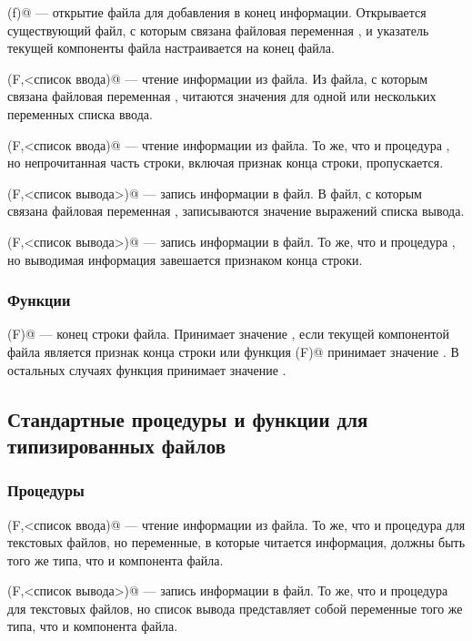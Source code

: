 \documentclass[12pt,a4paper]{article}
\theoremstyle{plain}
\theoremstyle{definition}
\theoremstyle{remark}
\begin{document}
\verb@Append(f)@ --- открытие файла для добавления в конец информации. Открывается существующий файл, с которым связана файловая переменная \verb@F@, и указатель текущей компоненты файла настраивается на конец файла.

\verb@Read(F,<список ввода)@ --- чтение информации из файла. Из файла, с которым связана файловая переменная \verb@F@, читаются значения для одной или нескольких переменных списка ввода.

\verb@ReadLn(F,<список ввода)@ --- чтение информации из файла. То же, что и процедура \verb@read@, но непрочитанная часть строки, включая признак конца строки, пропускается.

\verb@Write(F,<список вывода>)@ --- запись информации в файл. В файл, с которым связана файловая переменная \verb@F@, записываются значение выражений списка вывода.

\verb@WriteLn(F,<список вывода>)@ --- запись информации в файл. То же, что и процедура \verb@write@, но выводимая информация завешается признаком конца строки.

\subsubsection*{Функции}

\verb@Eoln(F)@ --- конец строки файла. Принимает значение \verb@true@, если текущей компонентой файла является признак конца строки или функция \verb@eof(F)@ принимает значение \verb@true@. В остальных случаях функция принимает значение \verb@false@.

\subsection{Стандартные процедуры и функции для типизированных файлов}

\subsubsection*{Процедуры}

\verb@Read(F,<список ввода)@ --- чтение информации из файла. То же, что и процедура \verb@read@ для текстовых файлов, но переменные, в которые читается информация, должны быть того же типа, что и компонента файла. 

\verb@Write(F,<список вывода>)@ --- запись информации в файл. То же, что и процедура \verb@write@ для текстовых файлов, но список вывода представляет собой переменные того же типа, что и компонента файла.
\end{document}
